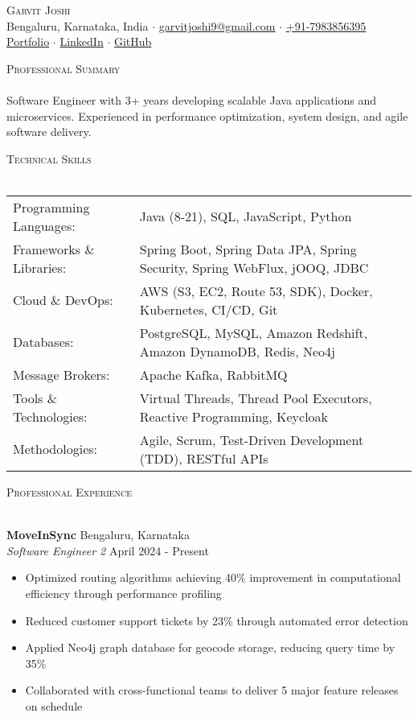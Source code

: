 \documentclass[a4paper]{article}
\newcommand{\lineunder} {
    \vspace*{-8pt} \\
    \hspace*{-18pt} \hrulefill \\
}
\newcommand{\header} [1] {
    {\hspace*{-18pt}\vspace*{6pt} \textsc{#1}}
    \vspace*{-6pt} \lineunder
}
\begin{document}
\vspace*{-30pt}

    

\vspace*{-10pt}
\begin{center}
	{\Huge \scshape {Garvit Joshi}}\\
	Bengaluru, Karnataka, India $\cdot$ \href{mailto:garvitjoshi9@gmail.com}{garvitjoshi9@gmail.com} $\cdot$ \href{tel:+917983856395}{+91-7983856395}\\
	\href{https://garvit-joshi.github.io}{Portfolio} $\cdot$ \href{https://www.linkedin.com/in/garvitjoshi9/}{LinkedIn} $\cdot$ \href{https://github.com/garvit-joshi/}{GitHub}\\
\end{center}

\header{Professional Summary}
Software Engineer with 3+ years developing scalable Java applications and microservices. Experienced in performance optimization, system design, and agile software delivery.

\header{Technical Skills}
\begin{tabular}{ l l }
	Programming Languages: & Java (8-21), SQL, JavaScript, Python \\
	Frameworks \& Libraries: & Spring Boot, Spring Data JPA, Spring Security, Spring WebFlux, jOOQ, JDBC \\
	Cloud \& DevOps: & AWS (S3, EC2, Route 53, SDK), Docker, Kubernetes, CI/CD, Git \\
	Databases: & PostgreSQL, MySQL, Amazon Redshift, Amazon DynamoDB, Redis, Neo4j \\
	Message Brokers: & Apache Kafka, RabbitMQ \\
	Tools \& Technologies: & Virtual Threads, Thread Pool Executors, Reactive Programming, Keycloak \\
	Methodologies: & Agile, Scrum, Test-Driven Development (TDD), RESTful APIs \\
\end{tabular}
\vspace{0mm}

\header{Professional Experience}
\vspace{0mm}

\textbf{MoveInSync} \hfill Bengaluru, Karnataka\\
\textit{Software Engineer 2} \hfill April 2024 - Present\\
\vspace{-1mm}
\begin{itemize} \itemsep -2pt
    \item Optimized routing algorithms achieving 40\% improvement in computational efficiency through performance profiling
    \item Reduced customer support tickets by 23\% through automated error detection
    \item Applied Neo4j graph database for geocode storage, reducing query time by 35\%
    \item Collaborated with cross-functional teams to deliver 5 major feature releases on schedule
\end{itemize}
\end{document}
